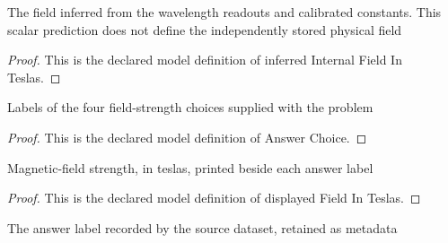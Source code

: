 \begin{definition}
  \label{def:physics:phyx-mini-0578:phyxminiproblems-problemphyxmini0578-inferredinternalfieldinteslas}
  The field inferred from the wavelength readouts and calibrated constants. This scalar prediction does not define the independently stored physical field
\end{definition}
\begin{proof}
  This is the declared model definition of inferred Internal Field In Teslas.
\end{proof}
\begin{definition}
  \label{def:physics:phyx-mini-0578:phyxminiproblems-problemphyxmini0578-answerchoice}
  Labels of the four field-strength choices supplied with the problem
\end{definition}
\begin{proof}
  This is the declared model definition of Answer Choice.
\end{proof}
\begin{definition}
  \label{def:physics:phyx-mini-0578:phyxminiproblems-problemphyxmini0578-displayedfieldinteslas}
  Magnetic-field strength, in teslas, printed beside each answer label
\end{definition}
\begin{proof}
  This is the declared model definition of displayed Field In Teslas.
\end{proof}
\begin{definition}
  \label{def:physics:phyx-mini-0578:phyxminiproblems-problemphyxmini0578-recordeddatasetanswer}
  The answer label recorded by the source dataset, retained as metadata
\end{definition}
